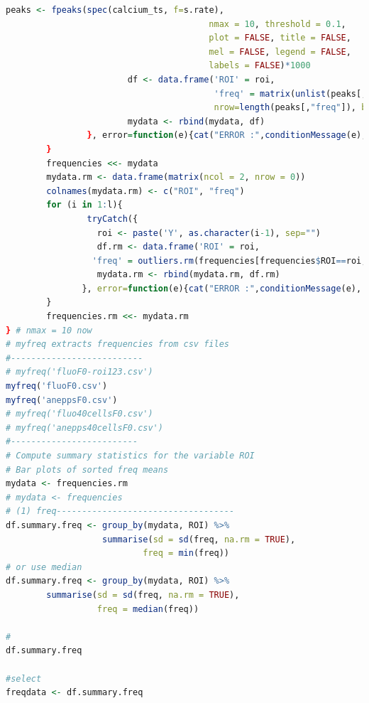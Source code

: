 \documentclass{biophys-new}
\begin{document}
\begin{lstlisting}[language=R]
                        peaks <- fpeaks(spec(calcium_ts, f=s.rate),
                                        nmax = 10, threshold = 0.1,
                                        plot = FALSE, title = FALSE,
                                        mel = FALSE, legend = FALSE,
                                        labels = FALSE)*1000
                        df <- data.frame('ROI' = roi,
                                         'freq' = matrix(unlist(peaks[,"freq"]),
                                         nrow=length(peaks[,"freq"]), byrow=T))
                        mydata <- rbind(mydata, df)
                }, error=function(e){cat("ERROR :",conditionMessage(e), "\n")})
        }
        frequencies <<- mydata
        mydata.rm <- data.frame(matrix(ncol = 2, nrow = 0))
        colnames(mydata.rm) <- c("ROI", "freq")
        for (i in 1:l){
                tryCatch({
                  roi <- paste('Y', as.character(i-1), sep="")
                  df.rm <- data.frame('ROI' = roi,
                 'freq' = outliers.rm(frequencies[frequencies$ROI==roi,]$freq))
                  mydata.rm <- rbind(mydata.rm, df.rm)
               }, error=function(e){cat("ERROR :",conditionMessage(e), "\n")})
        }
        frequencies.rm <<- mydata.rm
} # nmax = 10 now
# myfreq extracts frequencies from csv files
#--------------------------
# myfreq('fluoF0-roi123.csv')
myfreq('fluoF0.csv')
myfreq('aneppsF0.csv')
# myfreq('fluo40cellsF0.csv')
# myfreq('anepps40cellsF0.csv')
#-------------------------
# Compute summary statistics for the variable ROI
# Bar plots of sorted freq means
mydata <- frequencies.rm
# mydata <- frequencies
# (1) freq-----------------------------------
df.summary.freq <- group_by(mydata, ROI) %>%
                   summarise(sd = sd(freq, na.rm = TRUE),
                           freq = min(freq))
# or use median
df.summary.freq <- group_by(mydata, ROI) %>%
        summarise(sd = sd(freq, na.rm = TRUE),
                  freq = median(freq))

#
df.summary.freq

#select
freqdata <- df.summary.freq


\end{lstlisting}
\end{document}
